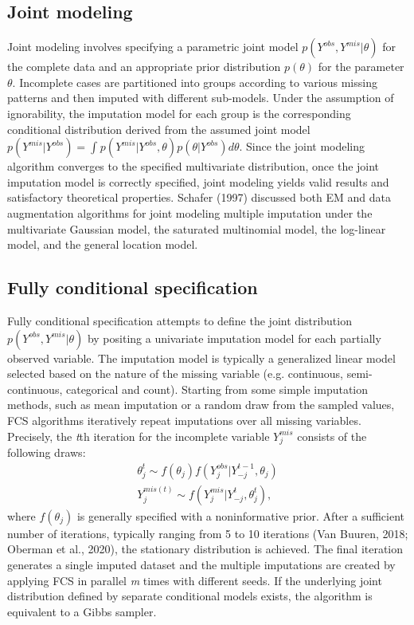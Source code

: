\documentclass[12pt, fullpage, a4paper]{article}
\begin{document}
\subsection{Joint modeling}
Joint modeling involves specifying a parametric joint model $p(Y^{obs}, Y^{mis}|\theta)$ for the complete data and an appropriate prior distribution $p(\theta)$ for the parameter $\theta$. Incomplete cases are partitioned into groups according to various missing patterns and then imputed with different sub-models. Under the assumption of ignorability, the imputation model for each group is the corresponding conditional distribution derived from the assumed joint model $p(Y^{mis}|Y^{obs}) = \int_{}p(Y^{mis}| Y^{obs}, \theta)p(\theta|Y^{obs})d\theta$. Since the joint modeling algorithm converges to the specified multivariate distribution, once the joint imputation model is correctly specified, joint modeling yields valid results and satisfactory theoretical properties. Schafer (1997) discussed both EM and data augmentation algorithms for joint modeling multiple imputation under the multivariate Gaussian model, the saturated multinomial model, the log-linear model, and the general location model. 

\subsection{Fully conditional specification}
Fully conditional specification attempts to define the joint distribution\\$p(Y^{obs}, Y^{mis}|\theta)$ by positing a univariate imputation model for each partially observed variable. The imputation model is typically a generalized linear model selected based on the nature of the missing variable (e.g. continuous, semi-continuous, categorical and count). Starting from some simple imputation methods, such as mean imputation or a random draw from the sampled values, FCS algorithms iteratively repeat imputations over all missing variables. Precisely, the \emph{t}th iteration for the incomplete variable \emph{$Y_{j}^{mis}$} consists of the following draws:
\begin{align*}
\theta_{j}^{t} \sim f(\theta_{j})f(Y_{j}^{obs}|Y_{-j}^{t-1}, \theta_{j})\\
Y_{j}^{mis(t)} \sim f(Y_{j}^{mis}|Y_{-j}^{t}, \theta_{j}^{t}),
\end{align*}
where $f(\theta_{j})$ is generally specified with a noninformative prior. After a sufficient number of iterations, typically ranging from 5 to 10 iterations (Van Buuren, 2018\nocite{van2018flexible}; Oberman et al., 2020\nocite{oberman2020missing}), the stationary distribution is achieved. The final iteration generates a single imputed dataset and the multiple imputations are created by applying FCS in parallel \emph{m} times with different seeds. If the underlying joint distribution defined by separate conditional models exists, the algorithm is equivalent to a Gibbs sampler. 
\end{document}
